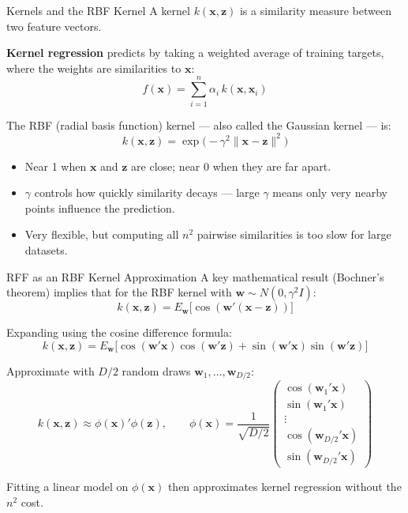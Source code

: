 \documentclass[aspectratio=169,t]{beamer}
\begin{document}
\begin{frame}{Kernels and the RBF Kernel}
A \alert{kernel} $k(\mathbf{x}, \mathbf{z})$ is a similarity measure between two feature vectors.

\vspace{0.2cm}
\textbf{Kernel regression} predicts by taking a weighted average of training targets, where the weights are similarities to $\mathbf{x}$:
\[
f(\mathbf{x}) = \sum_{i=1}^n \alpha_i \, k(\mathbf{x}, \mathbf{x}_i)
\]

The \alert{RBF (radial basis function) kernel} --- also called the Gaussian kernel --- is:
\[
k(\mathbf{x}, \mathbf{z}) = \exp\!\bigl(-\gamma^2 \|\mathbf{x} - \mathbf{z}\|^2\bigr)
\]
\begin{itemize}
\item Near 1 when $\mathbf{x}$ and $\mathbf{z}$ are close; near 0 when they are far apart.
\item $\gamma$ controls how quickly similarity decays --- large $\gamma$ means only very nearby points influence the prediction.
\item Very flexible, but computing all $n^2$ pairwise similarities is too slow for large datasets.
\end{itemize}
\end{frame}

\begin{frame}{RFF as an RBF Kernel Approximation}
A key mathematical result (Bochner's theorem) implies that for the RBF kernel with $\mathbf{w} \sim N(0, \gamma^2 I)$:
\[
k(\mathbf{x}, \mathbf{z}) = E_{\mathbf{w}}\bigl[\cos(\mathbf{w}'(\mathbf{x} - \mathbf{z}))\bigr]
\]

Expanding using the cosine difference formula:
\[
k(\mathbf{x}, \mathbf{z}) = E_{\mathbf{w}}\bigl[\cos(\mathbf{w}'\mathbf{x})\cos(\mathbf{w}'\mathbf{z}) + \sin(\mathbf{w}'\mathbf{x})\sin(\mathbf{w}'\mathbf{z})\bigr]
\]

Approximate with $D/2$ random draws $\mathbf{w}_1, \ldots, \mathbf{w}_{D/2}$:
\[
k(\mathbf{x},\mathbf{z}) \approx \phi(\mathbf{x})'\phi(\mathbf{z}), \qquad
\phi(\mathbf{x}) = \frac{1}{\sqrt{D/2}}\begin{pmatrix}\cos(\mathbf{w}_1'\mathbf{x})\\\sin(\mathbf{w}_1'\mathbf{x})\\\vdots\\\cos(\mathbf{w}_{D/2}'\mathbf{x})\\\sin(\mathbf{w}_{D/2}'\mathbf{x})\end{pmatrix}
\]

Fitting a linear model on $\phi(\mathbf{x})$ then \alert{approximates kernel regression} without the $n^2$ cost.
\end{frame}
\end{document}
